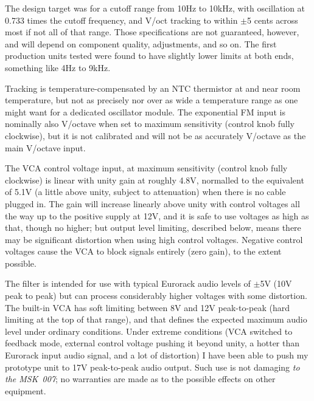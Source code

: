 The design target was for a cutoff range from 10Hz to 10kHz, with
oscillation at 0.733 times the cutoff frequency, and V/oct tracking to
within $\pm$5 cents across most if not all of that range.  Those
specifications are not guaranteed, however, and will depend on component
quality, adjustments, and so on.  The first production units tested were
found to have slightly lower limits at both ends, something like 4Hz to
9kHz.

Tracking is
temperature-compensated by an NTC thermistor at and near room temperature,
but not as precisely nor over as wide a temperature range as one might want
for a dedicated oscillator module.
The exponential FM input is
nominally also V/octave when set to maximum sensitivity (control knob fully
clockwise), but it is not calibrated and will not be as accurately V/octave
as the main V/octave input.

The VCA control voltage input, at maximum sensitivity (control knob fully
clockwise) is linear with unity gain at roughly 4.8V, normalled to the
equivalent of 5.1V (a little above unity, subject to attenuation) when there
is no cable plugged in.  The gain will increase linearly above unity with
control voltages all the way up to the positive supply at 12V, and it is
safe to use voltages as high as that, though no higher; but output level
limiting, described below, means there may be significant distortion when
using high control voltages.  Negative control voltages cause the VCA to
block signals entirely (zero gain), to the extent possible.

The filter is intended for use with typical Eurorack audio levels of
$\pm$5V (10V peak to peak) but can process considerably higher voltages
with some distortion.  The built-in VCA has soft limiting between 8V and 12V
peak-to-peak (hard limiting at the top of that range), and that defines the
expected maximum audio level under ordinary conditions.  Under extreme
conditions (VCA switched to feedback mode, external control voltage pushing
it beyond unity, a hotter than Eurorack input audio signal, and a lot of
distortion) I have been able to push my prototype unit to 17V peak-to-peak
audio output.  Such use is not damaging \emph{to the MSK~007}; no warranties
are made as to the possible effects on other equipment.

